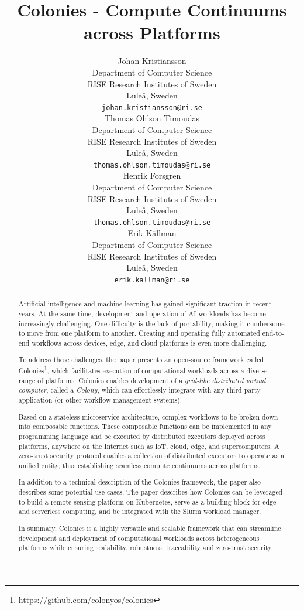 \documentclass{article}
\title{Colonies - Compute Continuums across Platforms}
\author{{\hspace{1mm}Johan Kristiansson} \\
	Department of Computer Science \\
	RISE Research Institutes of Sweden \\
	Luleå, Sweden \\
	\texttt{johan.kristiansson@ri.se} \\
	\And
	{\hspace{1mm}Thomas Ohlson Timoudas} \\
	Department of Computer Science \\
	RISE Research Institutes of Sweden \\
	Luleå, Sweden \\
	\texttt{thomas.ohlson.timoudas@ri.se} \\
	\And
	{\hspace{1mm}Henrik Forsgren} \\
	Department of Computer Science \\
	RISE Research Institutes of Sweden \\
	Luleå, Sweden \\
	\texttt{thomas.ohlson.timoudas@ri.se} \\
	\And
	{\hspace{1mm}Erik Källman} \\
	Department of Computer Science \\
	RISE Research Institutes of Sweden \\
	Luleå, Sweden \\
	\texttt{erik.kallman@ri.se} \\
}
\begin{document}
\maketitle

\begin{abstract}
Artificial intelligence and machine learning has gained significant traction in recent years. At the same time, development and operation of AI workloads has become increasingly challenging. One difficulty is the lack of portability, making it cumbersome to move from one platform to another. Creating and operating fully automated end-to-end workflows across devices, edge, and cloud platforms is even more challenging. 

    To address these challenges, the paper presents an open-source framework called Colonies\footnote{https://github.com/colonyos/colonies}, which facilitates execution of computational workloads across a diverse range of platforms. Colonies enables development of a \emph{grid-like distributed virtual computer}, called a \emph{Colony}, which can effortlessly integrate with any third-party application (or other workflow management systems).

Based on a stateless microservice architecture, complex workflows to be broken down into composable functions. These composable functions can be implemented in any programming language and be executed by distributed executors deployed across platforms, anywhere on the Internet such as IoT, cloud, edge, and supercomputers. A zero-trust security protocol enables a collection of distributed executors to operate as a unified entity, thus establishing seamless compute continuums across platforms.

In addition to a technical description of the Colonies framework, the paper also describes some potential use cases. The paper describes how Colonies can be leveraged to build a remote sensing platform on Kubernetes, serve as a building block for edge and serverless computing, and be integrated with the Slurm workload manager. 

In summary, Colonies is a highly versatile and scalable framework that can streamline development and deployment of computational workloads across heterogeneous platforms while ensuring scalability, robustness, traceability and zero-trust security.
\end{abstract}

\end{document}
